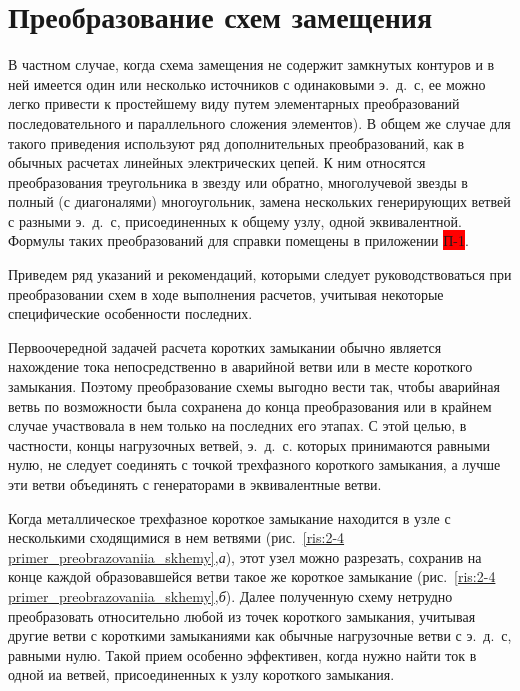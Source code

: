 \section{Преобразование схем замещения}
\label{sec:2-5}

В частном случае, когда схема замещения не содержит замкнутых контуров и в ней имеется один или несколько источников с одинаковыми э.~д.~с, ее можно легко привести к простейшему виду путем элементарных преобразований последовательного и параллельного сложения элементов). В общем же случае для такого приведения используют ряд дополнительных преобразований, как в обычных расчетах линейных электрических цепей. К ним относятся преобразования треугольника в звезду или обратно, многолучевой звезды в полный (с диагоналями) многоугольник, замена нескольких генерирующих ветвей с разными э.~д.~с, присоединенных к общему узлу, одной эквивалентной. Формулы таких преобразований для справки помещены в приложении \colorbox{red}{П-1}.

Приведем ряд указаний и рекомендаций, которыми следует руководствоваться при преобразовании схем в ходе выполнения расчетов, учитывая некоторые специфические особенности последних.

Первоочередной задачей расчета коротких замыкании обычно является нахождение тока непосредственно в аварийной ветви или в месте короткого замыкания. Поэтому преобразование схемы выгодно вести так, чтобы аварийная ветвь по возможности была сохранена до конца преобразования или в крайнем случае участвовала в нем только на последних его этапах. С этой целью, в частности, концы нагрузочных ветвей, э.~д.~с. которых принимаются равными нулю, не следует соединять с точкой трехфазного короткого замыкания, а лучше эти ветви объединять с генераторами в эквивалентные ветви.

Когда металлическое трехфазное короткое замыкание находится в узле с несколькими сходящимися в нем ветвями (рис.~\ref{ris:2-4 primer_preobrazovaniia_skhemy},\textit{а}), этот узел можно разрезать, сохранив на конце каждой образовавшейся ветви такое же короткое замыкание (рис.~\ref{ris:2-4 primer_preobrazovaniia_skhemy},\textit{б}). Далее полученную схему нетрудно преобразовать относительно любой из точек короткого замыкания, учитывая другие ветви с короткими замыканиями как обычные нагрузочные ветви с э.~д.~с, равными нулю. Такой прием особенно эффективен, когда нужно найти ток в одной иа ветвей, присоединенных к узлу короткого замыкания.

